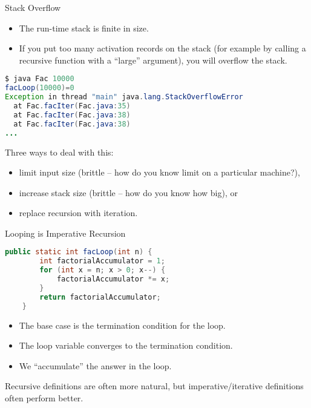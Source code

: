 \documentclass{beamer}
\begin{document}
\begin{frame}[fragile]{Stack Overflow}



\begin{itemize}
\item The run-time stack is finite in size.
\item If you put too many activation records on the stack (for example by calling a recursive function with a ``large'' argument), you will overflow the stack.
\end{itemize}

\begin{lstlisting}[language=Java]
$ java Fac 10000
facLoop(10000)=0
Exception in thread "main" java.lang.StackOverflowError
  at Fac.facIter(Fac.java:35)
  at Fac.facIter(Fac.java:38)
  at Fac.facIter(Fac.java:38)
...
\end{lstlisting}

Three ways to deal with this:

\begin{itemize}
\item limit input size (brittle -- how do you know limit on a particular machine?),
\item increase stack size (brittle -- how do you know how big), or
\item replace recursion with iteration.
\end{itemize}

\end{frame}

\begin{frame}[fragile]{Looping is Imperative Recursion}


\begin{lstlisting}[language=Java]
    public static int facLoop(int n) {
        int factorialAccumulator = 1;
        for (int x = n; x > 0; x--) {
            factorialAccumulator *= x;
        }
        return factorialAccumulator;
    }
\end{lstlisting}

\begin{itemize}
\item The base case is the termination condition for the loop.
\item The loop variable converges to the termination condition.
\item We ``accumulate'' the answer in the loop.
\end{itemize}

Recursive definitions are often more natural, but imperative/iterative definitions often perform better.

\end{frame}
\end{document}
